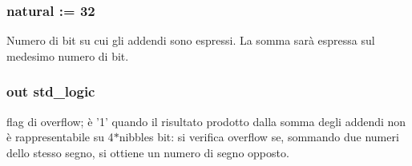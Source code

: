 \hypertarget{group___adder_gae7148956d4ef1d1cd14f35060634b9c3}{
\subsubsection[{generic\+\_\+cla\+\_\+adder}]{ {\bfseries \textcolor{vhdlchar}{ }} \hspace{0.3cm}{\ttfamily [Component]}}}\label{group___adder_gae7148956d4ef1d1cd14f35060634b9c3}
\hypertarget{group___adder_gae1435c07d0cd54b521535e2f8de6f94e}{
\subsubsection[{nbits}]{ {\bfseries \textcolor{vhdlchar}{ }} {\bfseries \textcolor{vhdlchar}{natural}\textcolor{vhdlchar}{ }\textcolor{vhdlchar}{ }\textcolor{vhdlchar}{\+:}\textcolor{vhdlchar}{=}\textcolor{vhdlchar}{ }\textcolor{vhdlchar}{ } \textcolor{vhdldigit}{32} \textcolor{vhdlchar}{ }} \hspace{0.3cm}{\ttfamily [Generic]}}}\label{group___adder_gae1435c07d0cd54b521535e2f8de6f94e}


Numero di bit su cui gli addendi sono espressi. La somma sarà espressa sul medesimo numero di bit. 

\hypertarget{group___adder_ga9650307dde287e0bcfa1e26370c006c2}{
\subsubsection[{overflow}]{ {\bfseries \textcolor{vhdlchar}{out}\textcolor{vhdlchar}{ }} {\bfseries \textcolor{vhdlchar}{std\+\_\+logic}\textcolor{vhdlchar}{ }} \hspace{0.3cm}{\ttfamily [Port]}}}\label{group___adder_ga9650307dde287e0bcfa1e26370c006c2}


flag di overflow; è '1' quando il risultato prodotto dalla somma degli addendi non è rappresentabile su 4$\ast$nibbles bit\+: si verifica overflow se, sommando due numeri dello stesso segno, si ottiene un numero di segno opposto. 

